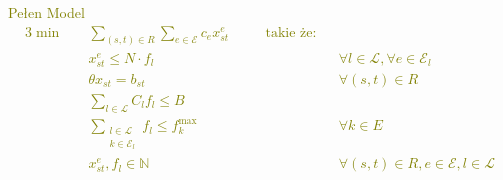 \documentclass[ignorenonframetext]{beamer}
\begin{document}
\textcolor{olive} {   
Pełen Model
\begin{alignat*}{3}
  \min \quad & \sum_{(s, t) \in R} \sum_{e \in \mathcal{E}} c_{e}x_{st}^{e} && \quad \text{takie że:} && \\
             & x_{st}^{e} \le N \cdot f_{l} && \quad && \forall l \in \mathcal{L}, \forall e \in \mathcal{E}_{l} \\
             & \theta x_{st} = b_{st}       && \quad && \forall (s, t) \in R \\
             & \sum_{l \in \mathcal{L}} C_{l}f_{l} \le B && \quad && \\
             & \sum_{\substack{l \in \mathcal{L} \\ k \in \mathcal{E}_{l}}} f_{l} \le f_{k}^{\max} && \quad && \forall k \in E \\
             & x_{st}^{e}, f_{l} \in \mathbb{N} && \quad && \forall (s, t) \in R, e \in \mathcal{E}, l \in \mathcal{L}
\end{alignat*}
}
\end{document}
